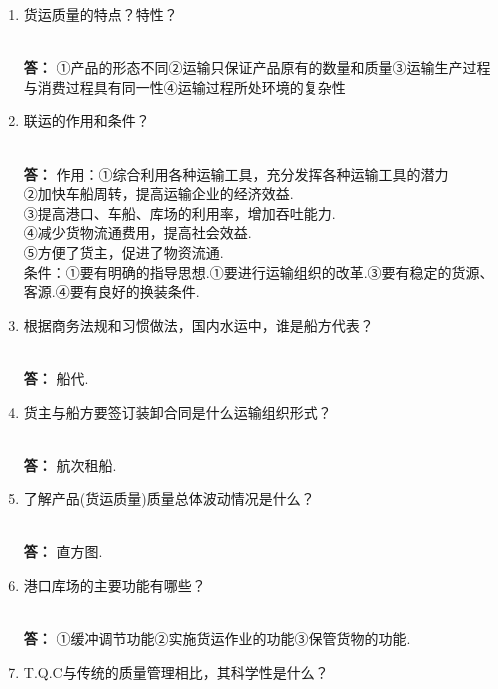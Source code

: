\documentclass[UTF8]{ctexart}
\begin{document}
\begin{enumerate}[1]
\begin{CJK}{UTF8}{you}
\end{CJK}
\\ \textbf{答：}  ①货物运价具有按不同运输距离或不同航线而别的特点.②货物运价只有销售价格一种形式③货物运价的种类繁多④ 水路货物运价是商品价格的组成部分.
\item \begin{CJK}{UTF8}{you} 货运质量的特点？特性？
\end{CJK}
\\ \textbf{答：}   ①产品的形态不同②运输只保证产品原有的数量和质量③运输生产过程与消费过程具有同一性④运输过程所处环境的复杂性
\item \begin{CJK}{UTF8}{you} 联运的作用和条件？
\end{CJK}
\\ \textbf{答：}  作用：①综合利用各种运输工具，充分发挥各种运输工具的潜力
\\ ②加快车船周转，提高运输企业的经济效益.
\\ ③提高港口、车船、库场的利用率，增加吞吐能力.
\\ ④减少货物流通费用，提高社会效益.
\\ ⑤方便了货主，促进了物资流通.
\\ 条件：①要有明确的指导思想.①要进行运输组织的改革.③要有稳定的货源、客源.④要有良好的换装条件.
\item \begin{CJK}{UTF8}{you} 根据商务法规和习惯做法，国内水运中，谁是船方代表？
\end{CJK}
\\ \textbf{答：}  船代.
\item \begin{CJK}{UTF8}{you} 货主与船方要签订装卸合同是什么运输组织形式？
\end{CJK}
\\ \textbf{答：} 航次租船.
\item \begin{CJK}{UTF8}{you} 了解产品(货运质量)质量总体波动情况是什么？
\end{CJK}
\\ \textbf{答：} 直方图.
\item \begin{CJK}{UTF8}{you} 港口库场的主要功能有哪些？
\end{CJK}
\\ \textbf{答：}  ①缓冲调节功能②实施货运作业的功能③保管货物的功能.
\item \begin{CJK}{UTF8}{you} T.Q.C与传统的质量管理相比，其科学性是什么？
\end{CJK}

\end{enumerate}
\end{document}
